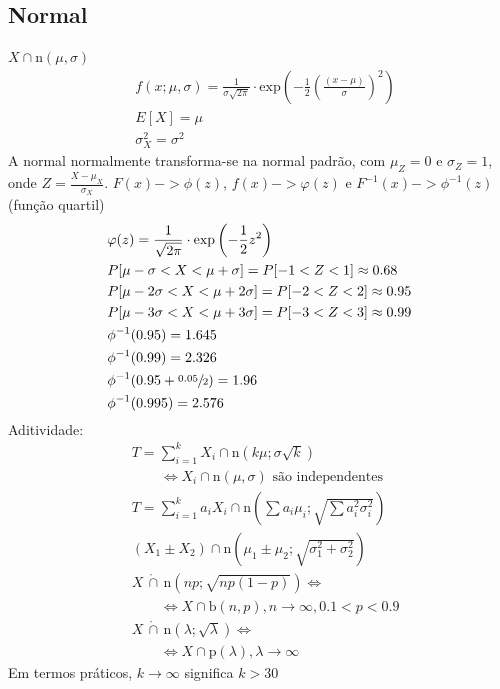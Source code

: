 \documentclass[a4paper]{article}
\newcommand{\aproxcap}{\, \mathring{\cap} \,}
\begin{document}
\begin{multicols}{3}
\subsection{Normal}
$X \cap \text{n}(\mu, \sigma)$
\begin{align*}
  &f(x; \mu, \sigma) = \frac{1}{\sigma\sqrt{2\pi}} \cdot \text{exp}\left(-\frac{1}{2}\left(\frac{(x - \mu)}{\sigma}\right)^2\right) \\
  &E[X] = \mu \\
  &\sigma^2_X = \sigma^2
\end{align*}
A normal normalmente transforma-se na normal padrão, com $\mu_Z = 0$ e $\sigma_Z = 1$, onde $Z = \frac{X - \mu_X}{\sigma_X}$.
$F(x) -> \phi(z)$, $ f(x) -> \varphi(z)$ e $F^{-1}(x) -> \phi^{-1}(z)$ (função quartil)
\begin{align*}
  &\varphi(z) = \frac{1}{\sqrt{2\pi}} \cdot \text{exp}\left(-\frac{1}{2}z^2\right) \\
  &P[\mu - \sigma < X < \mu + \sigma] = P[-1 < Z < 1] \approx 0.68 \\
  &P[\mu - 2\sigma < X < \mu + 2\sigma] = P[-2 < Z < 2] \approx 0.95 \\
  &P[\mu - 3\sigma < X < \mu + 3\sigma] = P[-3 < Z < 3] \approx 0.99 \\
  &\phi^{-1}(0.95) = 1.645 \\
  &\phi^{-1}(0.99) = 2.326 \\
  &\phi^{-1}(0.95 + \sfrac{0.05}{2}) = 1.96 \\
  &\phi^{-1}(0.995) = 2.576
\end{align*}
Aditividade:
\begin{align*}
  & T = \sum^k_{i=1} X_i \cap \text{n}\left(k \mu; \sigma \sqrt{k}\right) \\ & \qquad \iff X_i \cap \text{n}(\mu, \sigma) \text{ são independentes}\\
  & T = \sum^k_{i=1} a_i X_i \cap \text{n}\left(\sum a_i \mu_i; \sqrt{\sum a_i^2 \sigma_i^2}\right) \\
  & \left(X_1 \pm X_2\right) \cap \text{n}\left(\mu_1 \pm \mu_2; \sqrt{\sigma_1^2 + \sigma_2^2}\right) \\
  & X \aproxcap \text{n}(n p; \sqrt{np(1 - p)}) \iff \\ 
    &\qquad \iff X \cap \text{b}(n, p), n \to \infty, 0.1 < p < 0.9 \\
  & X \aproxcap \text{n}(\lambda; \sqrt{\lambda}) \iff \\ 
  &\qquad \iff X \cap \text{p}(\lambda), \lambda \to \infty
\end{align*}
Em termos práticos, $k \to \infty$ significa $k > 30$

\end{multicols}
\end{document}
